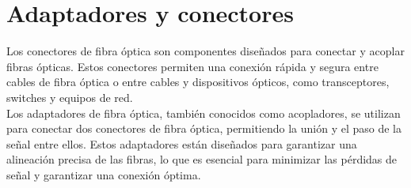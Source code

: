 \documentclass[
	12pt, %
	fleqn, %
	a4paper, %
	oneside, %
]{LegrandOrangeBook}
\begin{document}
\chapter{Adaptadores y conectores}
Los conectores de fibra óptica son componentes diseñados para conectar y acoplar fibras ópticas. Estos conectores permiten una conexión rápida y segura entre cables de fibra óptica o entre cables y dispositivos ópticos, como transceptores, switches y equipos de red. \\
Los adaptadores de fibra óptica, también conocidos como acopladores, se utilizan para conectar dos conectores de fibra óptica, permitiendo la unión y el paso de la señal entre ellos. Estos adaptadores están diseñados para garantizar una alineación precisa de las fibras, lo que es esencial para minimizar las pérdidas de señal y garantizar una conexión óptima.
\end{document}
